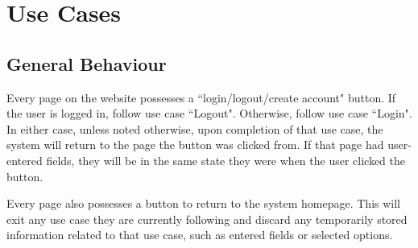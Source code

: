 \section{Use Cases}
\subsection{General Behaviour}
Every page on the website possesses a ``login/logout/create account" button.  If the user is logged in, follow use case ``Logout".  Otherwise, follow use case ``Login".  In either case, unless noted otherwise, upon completion of that use case, the system will return to the page the button was clicked from.  If that page had user-entered fields, they will be in the same state they were when the user clicked the button.

Every page also possesses a button to return to the system homepage.  This will exit any use case they are currently following and discard any temporarily stored information related to that use case, such as entered fields or selected options.


